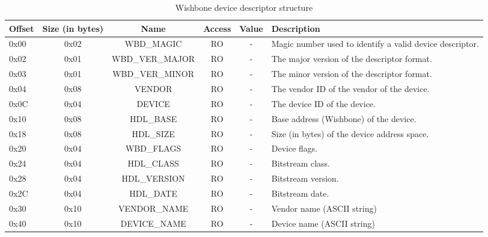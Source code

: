 \documentclass{article}
\begin{document}
\begin{center}
	\begin{savenotes}
	\begin{table}[!ht]\footnotesize
	\caption{Wishbone device descriptor structure}\label{dev_desc_struct}\centering
	\begin{tabular}{| l | c | c | c | c | p{5cm} |} \hline
	Offset & Size (in bytes) & Name & Access & Value & Description \\ \hline
	0x00 & 0x02 & WBD\_MAGIC & RO & - & Magic number used to identify a valid device descriptor. \\ \hline
	0x02 & 0x01 & WBD\_VER\_MAJOR & RO & - & The major version of the descriptor format. \\ \hline
	0x03 & 0x01 & WBD\_VER\_MINOR & RO & - & The minor version of the descriptor format. \\ \hline
	0x04 & 0x08 & VENDOR & RO & - & The vendor ID of the vendor of the device. \\ \hline
	0x0C & 0x04 & DEVICE & RO & - & The device ID of the device. \\ \hline
	0x10 & 0x08 & HDL\_BASE & RO & - & Base address (Wishbone) of the device. \\ \hline
	0x18 & 0x08 & HDL\_SIZE & RO & - & Size (in bytes) of the device address space. \\ \hline
	0x20 & 0x04 & WBD\_FLAGS & RO & - & Device flags. \\ \hline
	0x24 & 0x04 & HDL\_CLASS & RO & - & Bitstream class. \\ \hline
	0x28 & 0x04 & HDL\_VERSION & RO & - & Bitstream version. \\ \hline
	0x2C & 0x04 & HDL\_DATE & RO & - & Bitstream date. \\ \hline
	0x30 & 0x10 & VENDOR\_NAME & RO & - & Vendor name (ASCII string) \\ \hline
	0x40 & 0x10 & DEVICE\_NAME & RO & - & Device name (ASCII string) \\ \hline
	\end{tabular}
	\end{table}
	\end{savenotes}
\end{center}
\end{document}
